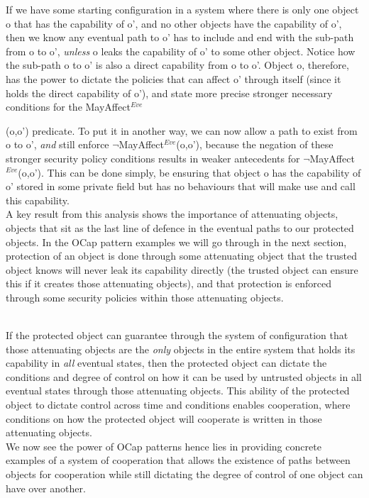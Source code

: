 \documentclass[a4paper,11pt, twoside,twocolumn]{article}
\newcommand{\loneg}{$\boldsymbol \neg$}
\begin{document}
If we have some starting configuration in a system where there is only one object o that has the capability of o', and no other objects have the capability of o', then we know any eventual path to o' has to include and end with the sub-path from o to o', \textit{unless} o leaks the capability of o' to some other object. Notice how the sub-path o to o' is also a direct capability from o to o'. Object o, therefore, has the power to dictate the policies that can affect o' through itself (since it holds the direct capability of o'), and state more precise stronger necessary conditions for the MayAffect$^{Eve}${(o,o') predicate. To put it in another way, we can now allow a path to exist from o to o', \textit{and} still enforce \loneg MayAffect$^{Eve}$(o,o'), because the negation of these stronger security policy conditions results in weaker antecedents for \loneg MayAffect$^{Eve}$(o,o'). This can be done simply, be ensuring that object o has the capability of o' stored in some private field but has no behaviours that will make use and call this capability.\\

A key result from this analysis shows the importance of attenuating objects, objects that sit as the last line of defence in the eventual paths to our protected objects. In the OCap pattern examples we will go through in the next section, protection of an object is done through some attenuating object that the trusted object knows will never leak its capability directly (the trusted object can ensure this if it creates those attenuating objects), and that protection is enforced through some security policies within those attenuating objects.\\\

If the protected object can guarantee through the system of configuration that those attenuating objects are the \textit{only} objects in the entire system that holds its capability in \textit{all} eventual states, then the protected object can dictate the conditions and degree of control on how it can be used by untrusted objects in all eventual states through those attenuating objects. This ability of the protected object to dictate control across time and conditions enables cooperation, where conditions on how the protected object will cooperate is written in those attenuating objects.
\\

We now see the power of OCap patterns hence lies in providing concrete examples of a system of cooperation that allows the existence of paths between objects for cooperation while still dictating the degree of control of one object can have over another.

}
\end{document}
